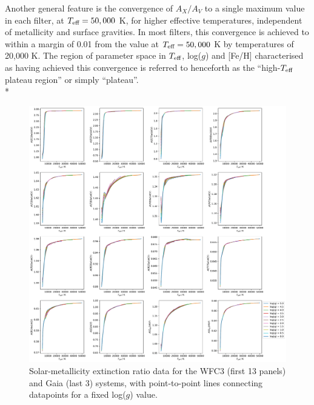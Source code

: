 \documentclass[12pt, a4paper]{report}
\begin{document}
Another general feature is the convergence of $A_{X}/A_{V}$ to a single maximum value in each filter, at $T_{\textnormal{eff}} = 50,000$ K, for higher effective temperatures, independent of metallicity and surface gravities. In most filters, this convergence is achieved to within a margin of 0.01 from the value at $T_{\textnormal{eff}} = 50,000$ K by temperatures of 20,000 K. The region of parameter space in $T_{\textnormal{eff}}$, log($g$) and [Fe/H] characterised as having achieved this convergence is referred to henceforth as the ``high-$T_{\textnormal{eff}}$ plateau region'' or simply ``plateau''.\\*

\begin{figure}[h]
\begin{center}
\includegraphics[scale=0.45]{../just_full_data/comb/AHub_FeH0p0_just_Teff_plot_lines.pdf}
\caption{Solar-metallicity extinction ratio data for the WFC3 (first 13 panels) and Gaia (last 3) systems, with point-to-point lines connecting datapoints for a fixed log($g$) value.}
\label{just_data_FeH0_WFC3gaia}
\end{center}
\end{figure}
\end{document}
